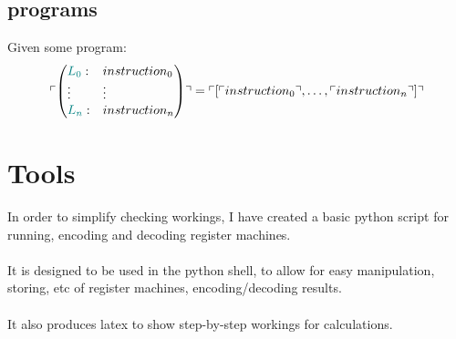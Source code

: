 \documentclass{report}
\begin{document}
            \subsection*{programs}
                Given some program:
                \[\ulcorner \left( \begin{matrix*}[l]
                    \instr{0}{instruction_0}
                    \vdots & \vdots \\
                    \instr{n}{instruction_n}
                \end{matrix*} \right) \urcorner = \ulcorner [\ulcorner instruction_0 \urcorner, \dots, \ulcorner instruction_n \urcorner] \urcorner\]
    \section*{Tools}
        In order to simplify checking workings, I have created a basic python script for running, encoding and decoding register machines.
        \\
        \\ It is designed to be used in the python shell, to allow for easy manipulation, storing, etc of register machines, encoding/decoding results.
        \\
        \\ It also produces latex to show step-by-step workings for calculations.
\end{document}
